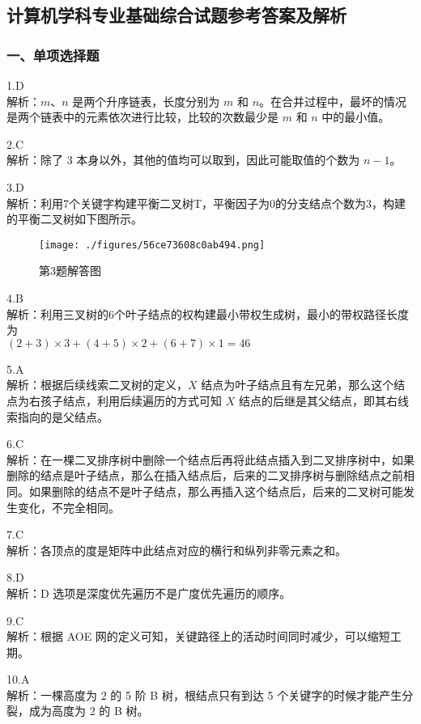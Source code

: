 \subsection{计算机学科专业基础综合试题参考答案及解析}
\subsubsection{一、单项选择题}
1.D \\
解析：$m$、$n$ 是两个升序链表，长度分别为 $m$ 和 $n$。在合并过程中，最坏的情况是两个链表中的元素依次进行比较，比较的次数最少是 $m$ 和 $n$ 中的最小值。

2.C \\
解析：除了 $3$ 本身以外，其他的值均可以取到，因此可能取值的个数为 $n-1$。 

3.D \\
解析：利用7个关键字构建平衡二叉树T，平衡因子为0的分支结点个数为3，构建的平衡二叉树如下图所示。
\begin{figure}[ht]
\centering
\texttt{[image: ./figures/56ce73608c0ab494.png]}
\caption{第3题解答图} \label{fig_CSN13_10}
\end{figure}

4.B \\
解析：利用三叉树的6个叶子结点的权构建最小带权生成树，最小的带权路径长度为 \\
$(2+3) \times 3 + (4+5) \times 2 + (6+7) \times 1 = 46$

5.A \\
解析：根据后续线索二叉树的定义，$X$ 结点为叶子结点且有左兄弟，那么这个结点为右孩子结点，利用后续遍历的方式可知 $X$ 结点的后继是其父结点，即其右线索指向的是父结点。

6.C \\
解析：在一棵二叉排序树中删除一个结点后再将此结点插入到二叉排序树中，如果删除的结点是叶子结点，那么在插入结点后，后来的二叉排序树与删除结点之前相同。如果删除的结点不是叶子结点，那么再插入这个结点后，后来的二叉树可能发生变化，不完全相同。

7.C \\
解析：各顶点的度是矩阵中此结点对应的横行和纵列非零元素之和。 

8.D \\
解析：D 选项是深度优先遍历不是广度优先遍历的顺序。

9.C \\
解析：根据 AOE 网的定义可知，关键路径上的活动时间同时减少，可以缩短工期。 

10.A \\
解析：一棵高度为 2 的 5 阶 B 树，根结点只有到达 5 个关键字的时候才能产生分裂，成为高度为 2 的 B 树。 

